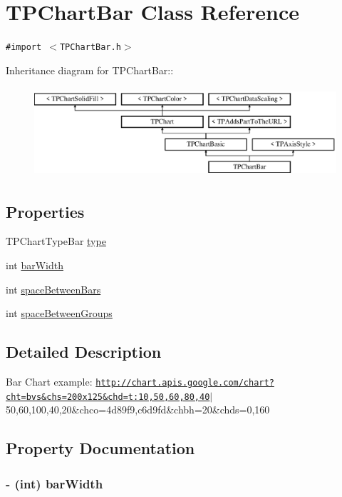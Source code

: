 \hypertarget{interface_t_p_chart_bar}{
\section{TPChartBar Class Reference}
\label{interface_t_p_chart_bar}
}
{\tt \#import $<$TPChartBar.h$>$}

Inheritance diagram for TPChartBar::\begin{figure}[H]
\begin{center}
\leavevmode
\includegraphics[height=3.31361cm]{interface_t_p_chart_bar}
\end{center}
\end{figure}
\subsection*{Properties}
\begin{CompactItemize}
\item 
TPChartTypeBar \hyperlink{interface_t_p_chart_bar_a6097d677c850f54a0e8a513356130d0}{type}
\item 
int \hyperlink{interface_t_p_chart_bar_e3b51efd638c009a91ab1b818f3dc165}{barWidth}
\item 
int \hyperlink{interface_t_p_chart_bar_8ec908b88d8db83273578b53002f654d}{spaceBetweenBars}
\item 
int \hyperlink{interface_t_p_chart_bar_2a66eac7dcb2b1f2445275af97d1955e}{spaceBetweenGroups}
\end{CompactItemize}


\subsection{Detailed Description}
Bar Chart example: \href{http://chart.apis.google.com/chart?cht=bvs&chs=200x125&chd=t:10,50,60,80,40}{\tt http://chart.apis.google.com/chart?cht=bvs\&chs=200x125\&chd=t:10,50,60,80,40}$|$50,60,100,40,20\&chco=4d89f9,c6d9fd\&chbh=20\&chds=0,160 

\subsection{Property Documentation}
\hypertarget{interface_t_p_chart_bar_e3b51efd638c009a91ab1b818f3dc165}{
\subsubsection[{barWidth}]{\setlength{\rightskip}{0pt plus 5cm}- (int) barWidth}}
\label{interface_t_p_chart_bar_e3b51efd638c009a91ab1b818f3dc165}


